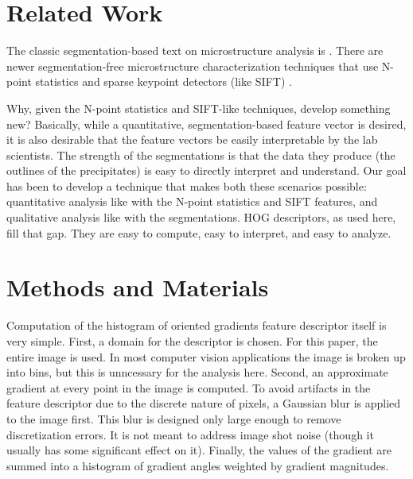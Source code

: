 \documentclass[review]{elsarticle}
\begin{document}
	\section{Related Work}
	The classic segmentation-based text on microstructure analysis is \cite{underwood}. There are newer segmentation-free microstructure characterization techniques that use N-point statistics \cite{kalidindi1, kalidindi2} and sparse keypoint detectors (like SIFT) \cite{decost}.

	Why, given the N-point statistics and SIFT-like techniques, develop something new? Basically, while a quantitative, segmentation-based feature vector is desired, it is also desirable that the feature vectors be easily interpretable by the lab scientists. The strength of the segmentations is that the data they produce (the outlines of the precipitates) is easy to directly interpret and understand. Our goal has been to develop a technique that makes both these scenarios possible: quantitative analysis like with the N-point statistics and SIFT features, and qualitative analysis like with the segmentations. HOG descriptors, as used here, fill that gap. They are easy to compute, easy to interpret, and easy to analyze.
	
	
	
	

	\section{Methods and Materials}
	Computation of the histogram of oriented gradients feature descriptor itself is very simple. First, a domain for the descriptor is chosen. For this paper, the entire image is used. In most computer vision applications the image is broken up into bins, but this is unncessary for the analysis here. Second, an approximate gradient at every point in the image is computed. To avoid artifacts in the feature descriptor due to the discrete nature of pixels, a Gaussian blur is applied to the image first. This blur is designed only large enough to remove discretization errors. It is not meant to address image shot noise (though it usually has some significant effect on it). Finally, the values of the gradient are summed into a histogram of gradient angles weighted by gradient magnitudes.
\end{document}
